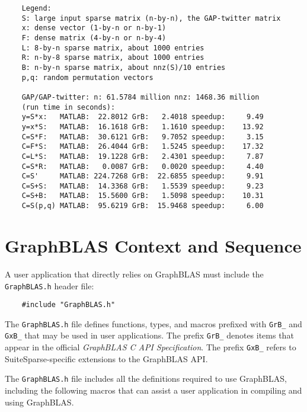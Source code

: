 \documentclass[12pt]{article}
\begin{document}
{\footnotesize
\begin{verbatim}
    Legend:
    S: large input sparse matrix (n-by-n), the GAP-twitter matrix
    x: dense vector (1-by-n or n-by-1)
    F: dense matrix (4-by-n or n-by-4)
    L: 8-by-n sparse matrix, about 1000 entries
    R: n-by-8 sparse matrix, about 1000 entries
    B: n-by-n sparse matrix, about nnz(S)/10 entries
    p,q: random permutation vectors

    GAP/GAP-twitter: n: 61.5784 million nnz: 1468.36 million
    (run time in seconds):
    y=S*x:   MATLAB:  22.8012 GrB:   2.4018 speedup:     9.49
    y=x*S:   MATLAB:  16.1618 GrB:   1.1610 speedup:    13.92
    C=S*F:   MATLAB:  30.6121 GrB:   9.7052 speedup:     3.15
    C=F*S:   MATLAB:  26.4044 GrB:   1.5245 speedup:    17.32
    C=L*S:   MATLAB:  19.1228 GrB:   2.4301 speedup:     7.87
    C=S*R:   MATLAB:   0.0087 GrB:   0.0020 speedup:     4.40
    C=S'     MATLAB: 224.7268 GrB:  22.6855 speedup:     9.91
    C=S+S:   MATLAB:  14.3368 GrB:   1.5539 speedup:     9.23
    C=S+B:   MATLAB:  15.5600 GrB:   1.5098 speedup:    10.31
    C=S(p,q) MATLAB:  95.6219 GrB:  15.9468 speedup:     6.00    \end{verbatim}

\newpage
\section{GraphBLAS Context and Sequence} %
\label{context}

A user application that directly relies on GraphBLAS must include the
\verb'GraphBLAS.h' header file:

\begin{mdframed}[userdefinedwidth=6in]
{\footnotesize
\begin{verbatim}
    #include "GraphBLAS.h"
\end{verbatim}
} \end{mdframed}

The \verb'GraphBLAS.h' file defines functions, types, and macros prefixed with
\verb'GrB_' and \verb'GxB_' that may be used in user applications.  The prefix
\verb'GrB_' denotes items that appear in the official {\em GraphBLAS C API
Specification}.  The prefix \verb'GxB_' refers to SuiteSparse-specific
extensions to the GraphBLAS API.

The \verb'GraphBLAS.h' file includes all the definitions required to use
GraphBLAS, including the following macros that can assist a user application in
compiling and using GraphBLAS.

}
\end{document}
